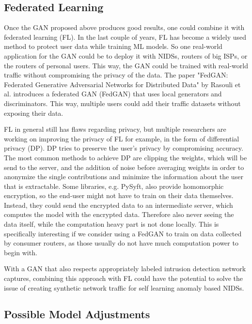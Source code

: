 \documentclass[
	ngerman,
	ruledheaders=section,%
	class=report,%
	thesis={type=bachelor},%
	accentcolor=9c,%
	custommargins=true,%
	marginpar=false,%
	parskip=half-,%
	fontsize=11pt,%
]{tudapub}
\begin{document}
\subsection{Federated Learning}
\label{sec:FL}

Once the GAN proposed above produces good results, one could combine it with federated learning (FL).
In the last couple of years, FL has become a widely used method to protect user data while training ML models.
So one real-world application for the GAN could be to deploy it with NIDSs, routers of big ISPs, or the routers of personal users.
This way, the GAN could be trained with real-world traffic without compromising the privacy of the data.
The paper "FedGAN: Federated Generative Adversarial Networks for Distributed Data" by Rasouli et al. \cite{rasouliFedGANFederatedGenerative2020} introduces a federated GAN (FedGAN) that uses local generators and discriminators.
This way, multiple users could add their traffic datasets without exposing their data.

FL in general still has flaws regarding privacy, but multiple researchers are working on improving the privacy of FL for example, in the form of differential privacy (DP).
DP tries to preserve the user's privacy by compromising accuracy.
The most common methods to achieve DP are clipping the weights, which will be send to the server, and the addition of noise before averaging weights in order to anonymize the single contributions and minimize the information about the user that is extractable.
Some libraries, e.g. PySyft, also provide homomorphic encryption, so the end-user might not have to train on their data themselves.
Instead, they could send the encrypted data to an intermediate server, which computes the model with the encrypted data.
Therefore also never seeing the data itself, while the computation heavy part is not done locally.
This is specifically interesting if we consider using a FedGAN to train on data collected by consumer routers,
as those usually do not have much computation power to begin with.

With a GAN that also respects appropriately labeled intrusion detection network captures,
combining this approach with FL could have the potential to solve the issue of creating synthetic network traffic for self learning anomaly based NIDSs.

\subsection{Possible Model Adjustments}
\label{sec:modelAdj}
\end{document}
